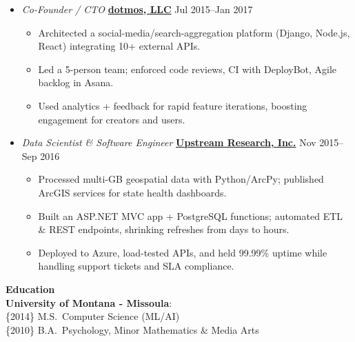 \documentclass[10pt]{article}
\begin{document}
\begin{itemize}
\item \textit{Co-Founder / CTO} \textbf{\href{https://dotmos.com}{dotmos, LLC}} \hfill Jul 2015–Jan 2017
  \begin{itemize}[leftmargin=1em]
    \item Architected a social-media/search-aggregation platform (Django, Node.js, React) integrating 10+ external APIs.
    \item Led a 5-person team; enforced code reviews, CI with DeployBot, Agile backlog in Asana.
    \item Used analytics + feedback for rapid feature iterations, boosting engagement for creators and users.
  \end{itemize}

\item \textit{Data Scientist \& Software Engineer} \textbf{\href{https://upstreamresearch.com}{Upstream Research, Inc.}} \hfill Nov 2015–Sep 2016
  \begin{itemize}[leftmargin=1em]
    \item Processed multi-GB geospatial data with Python/ArcPy; published ArcGIS services for state health dashboards.
    \item Built an ASP.NET MVC app + PostgreSQL functions; automated ETL \& REST endpoints, shrinking refreshes from days to hours.
    \item Deployed to Azure, load-tested APIs, and held 99.99\% uptime while handling support tickets and SLA compliance.
  \end{itemize}
\end{itemize}

{\small
\noindent\textbf{\large Education}\\
\textbf{University of Montana - Missoula}: \\ \{2014\} M.S.\ Computer Science (ML/AI) \\ \{2010\} B.A.\ Psychology, Minor Mathematics \& Media Arts
\normalsize}
\end{document}
